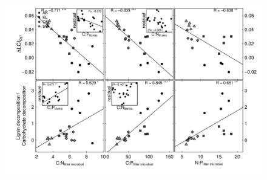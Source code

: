 \documentclass[10pt]{article}
\begin{document}
\begin{flushleft}
\newpage
\begin{figure}[h!]
\vspace*{2mm}
\begin{center}
\includegraphics{ligpaper-graphcorr2}
\end{center}
\end{figure}





\end{flushleft}
\end{document}
